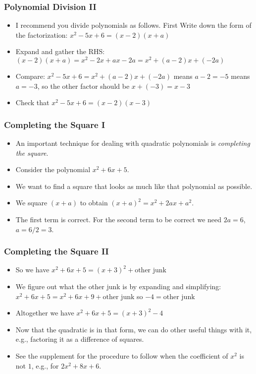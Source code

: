 \documentclass[serif,ignorenonframetext]{beamer}
\begin{document}
\begin{frame}
  \frametitle{Polynomial Division II}
  \begin{itemize}[<+->]
  \item I recommend you divide polynomials as follows.  First Write
    down the form of the factorization: $x^2-5x+6=(x-2)(x+a)$
  \item Expand and gather the RHS:
    $(x-2)(x+a)=x^2-2x+ax-2a=x^2+(a-2)x+(-2a)$
  \item Compare: $x^2-5x+6=x^2+(a-2)x+(-2a)$ means $a-2=-5$ means
    $a=-3$, so the other factor should be $x+(-3)=x-3$
  \item Check that $x^2-5x+6=(x-2)(x-3)$
  \end{itemize}
\end{frame}

\begin{frame}
  \frametitle{Completing the Square I}
  \begin{itemize}[<+->]
  \item An important technique for dealing with quadratic polynomials
    is \textit{completing the square}.
  \item Consider the polynomial $x^2+6x+5$.
  \item We want to find a square that looks as much like that
    polynomial as possible.
  \item We square $(x+a)$ to obtain $(x+a)^2=x^2+2ax+a^2$.
  \item The first term is correct.  For the second term to be correct
    we need $2a=6$, $a=6/2=3$.
  \end{itemize}
\end{frame}

\begin{frame}
  \frametitle{Completing the Square II}
  \begin{itemize}[<+->]
  \item So we have $x^2+6x+5=(x+3)^2+\mbox{other junk}$
  \item We figure out what the other junk is by expanding and
    simplifying: $x^2+6x+5=x^2+6x+9+\mbox{other junk}$ so
    $-4=\mbox{other junk}$
  \item Altogether we have $x^2+6x+5=(x+3)^2-4$
  \item Now that the quadratic is in that form, we can do other useful
    things with it, e.g., factoring it as a difference of squares.
  \item See the supplement for the procedure to follow when the
    coefficient of $x^2$ is not $1$, e.g., for $2x^2+8x+6$.
  \end{itemize}
\end{frame}
\end{document}

